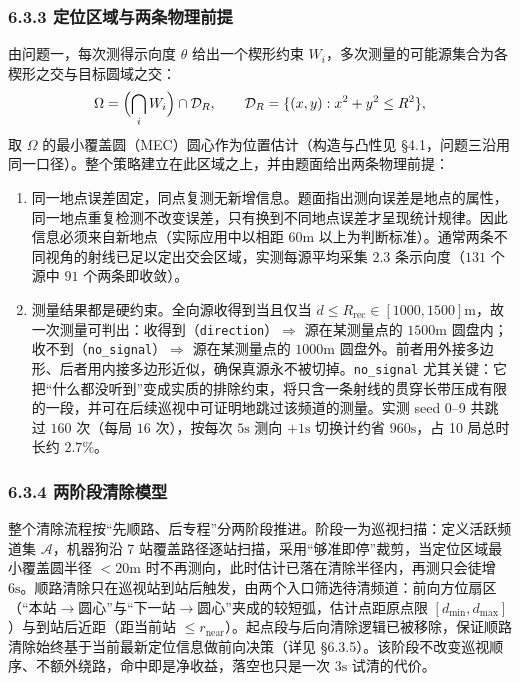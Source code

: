 \documentclass[UTF8, zihao=5,AutoFakeBold=2]{ctexart}
\begin{document}
\subsubsection*{6.3.3 定位区域与两条物理前提}

由问题一，每次测得示向度 \(\theta\) 给出一个楔形约束 \(W_i\)，多次测量的可能源集合为各楔形之交与目标圆域之交：
\begin{equation}
    \Omega=\Bigl(\bigcap_{i} W_i\Bigr)\cap \mathcal{D}_R,\qquad
    \mathcal{D}_R=\{(x,y):x^2+y^2\le R^2\},
\end{equation}
取 \(\Omega\) 的最小覆盖圆（MEC）圆心作为位置估计（构造与凸性见 \S4.1，问题三沿用同一口径）。整个策略建立在此区域之上，并由题面给出两条物理前提：

\begin{enumerate}
    \item 同一地点误差固定，同点复测无新增信息。题面指出测向误差是地点的属性，同一地点重复检测不改变误差，只有换到不同地点误差才呈现统计规律。因此信息必须来自新地点（实际应用中以相距 60m 以上为判断标准）。通常两条不同视角的射线已足以定出交会区域，实测每源平均采集 \(2.3\) 条示向度（\(131\) 个源中 \(91\) 个两条即收敛）。
    \item 测量结果都是硬约束。全向源收得到当且仅当 \(d\le R_{\text{rec}}\in[1000,1500]\text{m}\)，故一次测量可判出：收得到（\texttt{direction}）\(\Rightarrow\) 源在某测量点的 \(1500\text{m}\) 圆盘内；收不到（\texttt{no\_signal}）\(\Rightarrow\) 源在某测量点的 \(1000\text{m}\) 圆盘外。前者用外接多边形、后者用内接多边形近似，确保真源永不被切掉。\texttt{no\_signal} 尤其关键：它把“什么都没听到”变成实质的排除约束，将只含一条射线的贯穿长带压成有限的一段，并可在后续巡视中可证明地跳过该频道的测量。实测 seed 0--9 共跳过 \(160\) 次（每局 \(16\) 次），按每次 \(5\text{s}\) 测向 \(+1\text{s}\) 切换计约省 \(960\text{s}\)，占 10 局总时长约 \(2.7\%\)。
\end{enumerate}

\subsubsection*{6.3.4 两阶段清除模型}
整个清除流程按“先顺路、后专程”分两阶段推进。阶段一为巡视扫描：定义活跃频道集 \(\mathcal{A}\)，机器狗沿 7 站覆盖路径逐站扫描，采用“够准即停”裁剪，当定位区域最小覆盖圆半径 \(<20\text{m}\) 时不再测向，此时估计已落在清除半径内，再测只会徒增 \(6\text{s}\)。顺路清除只在巡视站到站后触发，由两个入口筛选待清频道：前向方位扇区（“本站\(\to\)圆心”与“下一站\(\to\)圆心”夹成的较短弧，估计点距原点限 \([d_{\min},d_{\max}]\)）与到站后近距（距当前站 \(\leq r_{\text{near}}\)）。起点段与后向清除逻辑已被移除，保证顺路清除始终基于当前最新定位信息做前向决策（详见 \S6.3.5）。该阶段不改变巡视顺序、不额外绕路，命中即是净收益，落空也只是一次 \(3\text{s}\) 试清的代价。
\end{document}
